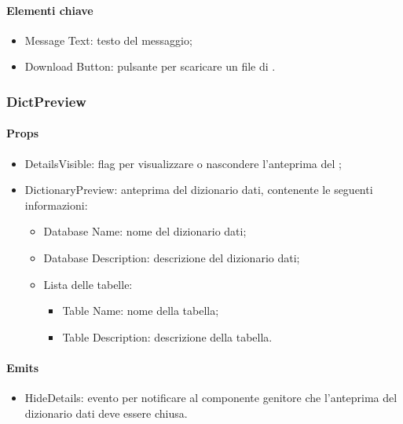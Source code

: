\paragraph*{Elementi chiave}
\begin{itemize}
  \item Message Text: testo del messaggio;
  \item Download Button: pulsante per scaricare un file di .
\end{itemize}

\subsubsection{DictPreview}

\paragraph*{Props}
\begin{itemize}
  \item DetailsVisible: flag per visualizzare o nascondere l'anteprima del ;
  \item DictionaryPreview: anteprima del dizionario dati, contenente le seguenti informazioni:
  \begin{itemize}
    \item Database Name: nome del dizionario dati;
    \item Database Description: descrizione del dizionario dati;
    \item Lista delle tabelle: 
    \begin{itemize}
      \item Table Name: nome della tabella;
      \item Table Description: descrizione della tabella.
    \end{itemize}
  \end{itemize}
\end{itemize}

\paragraph*{Emits}
\begin{itemize}
  \item HideDetails: evento per notificare al componente genitore che l'anteprima del dizionario dati deve essere chiusa.
\end{itemize}

